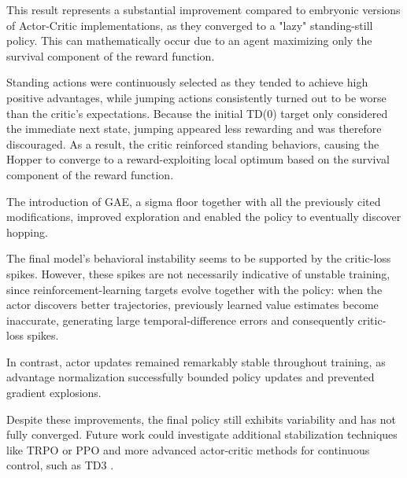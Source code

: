 This result represents a substantial improvement compared to embryonic versions of Actor-Critic implementations, as they 
converged to a "lazy" standing-still policy. This can mathematically occur due to an agent maximizing only the survival component of the reward function.


Standing actions were continuously selected as they tended to achieve high positive advantages, while jumping actions
consistently turned out to be worse than the critic’s expectations. Because the initial TD(0) target only considered
the immediate next state, jumping appeared less rewarding and was therefore discouraged. As a result, the critic
reinforced standing behaviors, causing the Hopper to converge to a reward-exploiting local optimum based on the
survival component of the reward function.


The introduction of GAE, a sigma floor together with all the previously cited modifications, improved exploration and enabled
the policy to eventually discover hopping.

The final model's behavioral instability seems to be supported by the critic-loss spikes.
However, these spikes are not necessarily indicative of unstable training, since reinforcement-learning targets evolve together
with the policy: when the actor discovers better trajectories, previously learned value estimates become inaccurate,
generating large temporal-difference errors and consequently critic-loss spikes.

In contrast, actor updates remained remarkably stable throughout training, as advantage normalization successfully bounded
policy updates and prevented gradient explosions.

Despite these improvements, the final policy still exhibits variability and has not fully converged. Future work
could investigate additional stabilization techniques like TRPO or PPO \cite{SchulmanTRPO2015, SchulmanPPO2017} and
more advanced actor-critic methods for continuous control, such as TD3 \cite{Fujimoto2018}.

